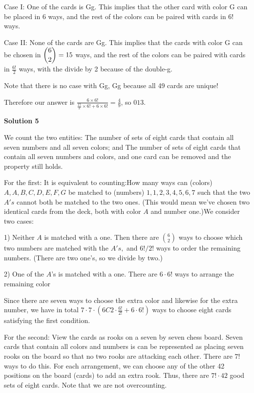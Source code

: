 \begin{enumerate}
 Case I: One of the cards is Gg. This implies that the other card with color G can be placed in $6$ ways, and the rest of the colors can be paired with cards in $6!$ ways. 

 Case II: None of the cards are Gg. This implies that the cards with color G can be chosen in $\dbinom{6}{2}=15$ ways, and the rest of the colors can be paired with cards in $\frac{6!}{2}$ ways, with the divide by 2 because of the double-g.

 Note that there is no case with Gg, Gg because all 49 cards are unique!

 Therefore our answer is $\frac{6\times6!}{\frac{15}{2}\times6! + 6\times6!}=\frac{4}{9}$, so $\boxed{013}$.

 



\textbf{Solution 5}

We count the two entities: The number of sets of eight cards that contain all seven numbers and all seven colors; and The number of sets of eight cards that contain all seven numbers and colors, and one card can be removed and the property still holds.

 For the first: It is equivalent to counting:How many ways can (colors) $A, A, B, C, D, E, F, G$ be matched to (numbers) $1, 1, 2, 3, 4, 5, 6, 7$ such that the two $A's$ cannot both be matched to the two ones. (This would mean we've chosen two identical cards from the deck, both with color $A$ and number one.)We consider two cases: 

 1) Neither $A$ is matched with a one. Then there are $\binom{6}{2}$ ways to choose which two numbers are matched with the $A's,$ and $6! / 2!$ ways to order the remaining numbers. (There are two one's, so we divide by two.)

 2) One of the $A$'s is matched with a one. There are $6 \cdot 6!$ ways to arrange the remaining color

 Since there are seven ways to choose the extra color and likewise for the extra number, we have in total $7 \cdot 7 \cdot \left( 6C2 \cdot \frac{6!}{2!} + 6 \cdot 6! \right)$ ways to choose eight cards satisfying the first condition.

 For the second: View the cards as rooks on a seven by seven chess board. Seven cards that contain all colors and numbers is can be represented as placing seven rooks on the board so that no two rooks are attacking each other. There are $7!$ ways to do this. For each arrangement, we can choose any of the other 42 positions on the board (cards) to add an extra rook. Thus, there are $7! \cdot 42$ good sets of eight cards. Note that we are not overcounting.


\end{enumerate}

